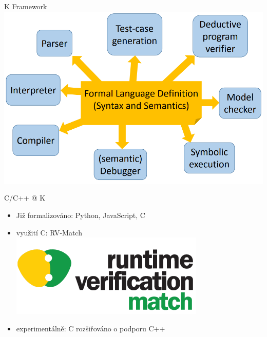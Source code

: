 \documentclass[11pt]{beamer}
\begin{document}
% 

\begin{frame}{K Framework}
\includegraphics[width=1.0\linewidth]{img/kidea.png}
\end{frame}

\begin{frame}{C/C++ @ K}
\begin{itemize}
\item Již formalizováno: Python, JavaScript, C
\pause \item využití C: RV-Match \\
\includegraphics[width=0.3\linewidth]{img/rvmatch.png}
\pause \item experimentálně: C rozšiřováno o podporu C++

\end{itemize}
\end{frame}
\end{document}
